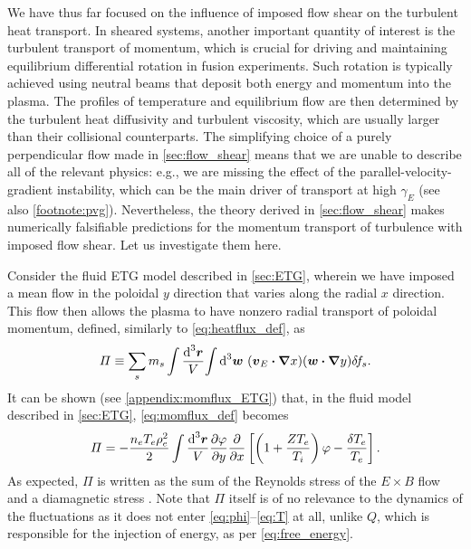 \documentclass{jpp}
\newcommand{\phinorm}{\varphi}
\newcommand{\gammaE}{\gamma_{E}}
\begin{document}
We have thus far focused on the influence of imposed flow shear on the turbulent heat transport. In sheared systems, another important quantity of interest is the turbulent transport of momentum, which is crucial for driving and maintaining equilibrium differential rotation in fusion experiments. Such rotation is typically achieved using neutral beams that deposit both energy and momentum into the plasma. The profiles of temperature and equilibrium flow are then determined by the turbulent heat diffusivity and turbulent viscosity, which are usually larger than their collisional counterparts. The simplifying choice of a purely perpendicular flow made in \cref{sec:flow_shear} means that we are unable to describe all of the relevant physics: e.g., we are missing the effect of the parallel-velocity-gradient instability, which can be the main driver of transport at high \(\gammaE\) \citep{highcock10, barnes_shear11} (see also \cref{footnote:pvg}). Nevertheless, the theory derived in \cref{sec:flow_shear} makes numerically falsifiable predictions for the momentum transport of turbulence with imposed flow shear. Let us investigate them here.

Consider the fluid ETG model described in \cref{sec:ETG}, wherein we have imposed a mean flow in the poloidal \(y\) direction that varies along the radial \(x\) direction. This flow then allows the plasma to have nonzero radial transport of poloidal momentum, defined, similarly to \cref{eq:heatflux_def}, as
\begin{equation}
	\varPi \equiv \sum_s m_s \int \frac{\text{d}^3 \boldsymbol{r}}{V} {\int \text{d}^{3} \boldsymbol{w} \ } (\boldsymbol{v}_E \boldsymbol{\cdot} {\boldsymbol{\nabla}} x) (\boldsymbol{w} \boldsymbol{\cdot} {\boldsymbol{\nabla}} y) \delta \! f_{s}. \label{eq:momflux_def}
\end{equation}
It can be shown (see \cref{appendix:momflux_ETG}) that, in the fluid model described in \cref{sec:ETG}, \cref{eq:momflux_def} becomes
\begin{equation}
	\Pi = -\frac{n_{e} T_{e} \rhoe^2 }{2}  \int \frac{\rmd^3 \vec{r}}{V} \frac{\partial \phinorm}{\partial y} \frac{\partial}{\partial x} \left[\left(1 + \frac{Z T_{e}}{T_{i}}\right) \phinorm - \frac{\delta T_e}{T_{e}}\right].
	\label{eq:momflux_etg}
\end{equation}
As expected, \(\Pi\) is written as the sum of the Reynolds stress of the \(E\times B\) flow and a diamagnetic stress \citep{smolyakov00, ivanov20, sarazin21}. Note that \(\Pi\) itself is of no relevance to the dynamics of the fluctuations as it does not enter \cref{eq:phi}--\cref{eq:T} at all, unlike \(Q\), which is responsible for the injection of energy, as per \cref{eq:free_energy}.
\end{document}
